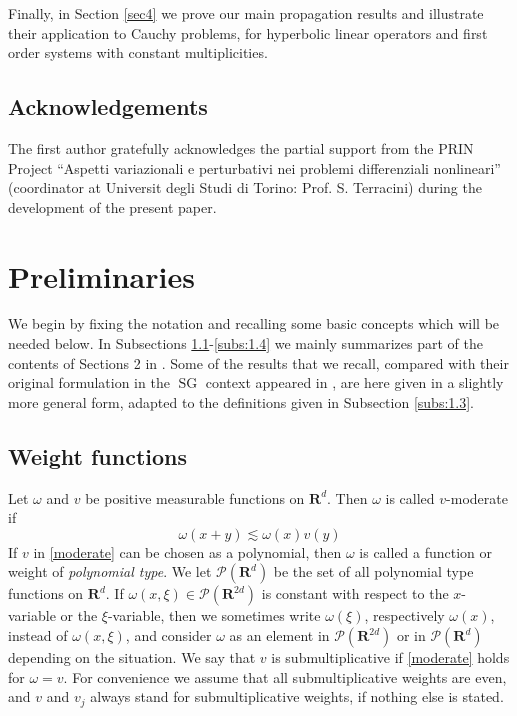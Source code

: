 \documentclass[12pt,a4paper,reqno]{amsart}
\numberwithin{equation}{section}
\numberwithin{thm}{section}
\theoremstyle{definition}
\theoremstyle{remark}
\begin{document}
\par

Finally, in Section \ref{sec4} we prove our main propagation results and illustrate
their application to Cauchy problems, for hyperbolic linear operators and first order
systems with constant multiplicities.

\subsection*{Acknowledgements}
The first author gratefully acknowledges the partial support from the
PRIN Project ``Aspetti variazionali e perturbativi nei problemi differenziali nonlineari''
(coordinator at Universit degli Studi di Torino: Prof. S. Terracini)
during the development of the present paper.

\section{Preliminaries}\label{sec1}

\par

We begin by fixing the notation and recalling some basic concepts
which will be needed below.
In Subsections
\ref{subs:1.1}-\ref{subs:1.4} we mainly summarizes part of the contents
of Sections 2 in \cite{CJT2,CJT3,CoTo2}. Some of the results that we recall,
compared with their original formulation in the ${\operatorname{SG}}$ context
appeared in \cite{coriasco}, are here given in a slightly more general
form, adapted to the definitions given in Subsection \ref{subs:1.3}. 

\par
\subsection{Weight functions}\label{subs:1.1}
Let $\omega$ and $v$ be positive measurable functions
on ${\mathbf R^{d}}$. Then $\omega$ is called $v$-moderate if
\begin{equation}\label{moderate}
\omega (x+y) \lesssim \omega (x)v(y)
\end{equation}
If $v$ in \eqref{moderate} can be chosen as a polynomial, then $\omega$ is
called a function or weight of \emph{polynomial type}.
We let $\mathscr P({\mathbf R^{d}})$ be the set
of all polynomial type functions on ${\mathbf R^{d}}$. If $\omega (x,\xi
)\in \mathscr P({\mathbf R^{{2d}}})$ is constant with respect to the
$x$-variable or the $\xi$-variable, then we sometimes write $\omega
(\xi )$, respectively $\omega (x)$, instead of $\omega (x,\xi )$,
and consider
$\omega$ as an element in $\mathscr P({\mathbf R^{{2d}}})$ or in $\mathscr P({\mathbf R^{d}})$ depending on the situation. We say that $v$ is submultiplicative
if \eqref{moderate} holds for $\omega=v$. For convenience we assume
that all submultiplicative weights are even, and
$v$ and $v_j$ always stand for submultiplicative weights, if nothing else is stated.
\end{document}
